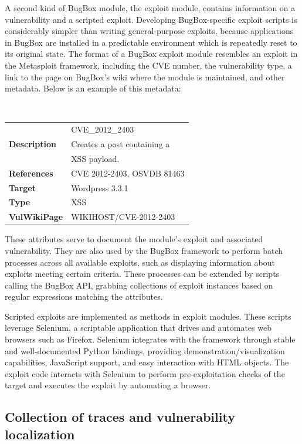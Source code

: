 \documentclass[letterpaper,twocolumn,10pt]{article}
\begin{document}
A second kind of BugBox module, the exploit module, contains information on a vulnerability and a scripted exploit. Developing BugBox-specific exploit scripts is considerably simpler than writing general-purpose exploits, because applications in BugBox are installed in a predictable environment which is repeatedly reset to its original state. The format of a BugBox exploit module resembles an exploit in the Metasploit framework, including the CVE number, the vulnerability type, a link to the page on BugBox's wiki where the module is maintained, and other metadata. Below is an example of this metadata:

\begin{minipage}{\textwidth}
{\tt \small
\begin{tabular} { l l }
\noindent{\bf Name}&CVE\_2012\_2403\\
{\bf Description}&Creates a post containing a\\& XSS payload.\\
{\bf References}&CVE 2012-2403, OSVDB 81463 \\
{\bf Target}&Wordpress 3.3.1\\
{\bf Type}&XSS\\
{\bf VulWikiPage}&WIKIHOST/CVE-2012-2403
\end{tabular}
}
\end{minipage}

These attributes serve to document the module's exploit and associated vulnerability. They are also used by the BugBox framework to perform batch processes across all available exploits, such as displaying information about exploits meeting certain criteria. These processes can be extended by scripts calling the BugBox API, grabbing collections of exploit instances based on regular expressions matching the attributes.

Scripted exploits are implemented as methods in exploit modules. These scripts leverage Selenium, a scriptable application that drives and automates web browsers such as Firefox. Selenium integrates with the framework through stable and well-documented Python bindings, providing demonstration/visualization capabilities, JavaScript support, and easy interaction with HTML objects. The exploit code interacts with Selenium to perform pre-exploitation checks of the target and executes the exploit by automating a browser.

\subsection{Collection of traces and vulnerability localization}
\end{document}
